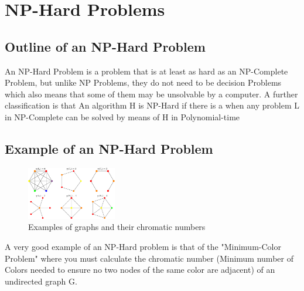 \documentclass{article}
\begin{document}
	\section{NP-Hard Problems}
		\subsection{Outline of an NP-Hard Problem}
			An NP-Hard Problem is a problem that is at least as hard as an NP-Complete Problem, but unlike NP Problems, they do not need to be decision Problems which also means that some of them may be unsolvable by a computer. A further classification is that An algorithm H is NP-Hard if there is a when any problem L in NP-Complete can be solved by means of H in Polynomial-time \citep{10.1145_1008304.1008305}
			\subsection{Example of an NP-Hard Problem}
				\begin{figure}[H]
					\centering
					\includegraphics[width=0.35\textwidth]{chromatic_number.png}
					\caption{Examples of graphs and their chromatic numbers \cite{weisstein}}
				\end{figure}
				A very good example of an NP-Hard problem is that of the "Minimum-Color Problem" where you must calculate the chromatic number (Minimum number of Colors needed to ensure no two nodes of the same color are adjacent) of an undirected graph G.
\end{document}
